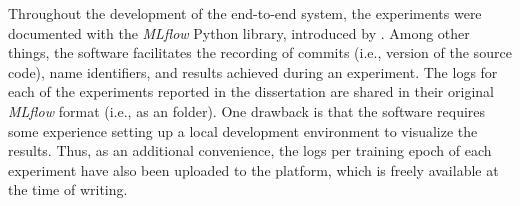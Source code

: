 
Throughout the development of the end-to-end system, the
experiments were documented with the \emph{MLflow} Python
library, introduced by \textcite{zaharia2018accelerating}.
Among other things, the software facilitates the recording
of  commits (i.e., version of the source code),
name identifiers, and results achieved during an experiment.
The logs for each of the experiments reported in the
dissertation are shared in their original \emph{MLflow}
format (i.e., as an  folder). One drawback is
that the software requires some experience setting up a
local development environment to visualize the results.
Thus, as an additional convenience, the logs per training
epoch of each experiment have also been uploaded to the
platform, which is
freely available at the time of writing.
